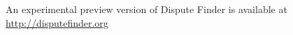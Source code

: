\documentclass{www2010-accepted}
\newcommand{\todo}[1]{}
\begin{document}
An experimental preview version of Dispute Finder is available at 
\url{http://disputefinder.org}


\todo{Add count of disputed claims}


\todo{Do we want to have acknowledgements}


\todo{Sort out bad references}

\end{document}
